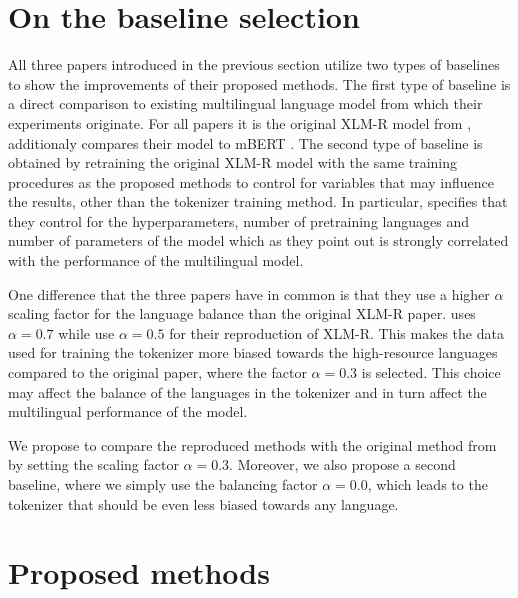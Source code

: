 
\section{On the baseline selection}

All three papers introduced in the previous section utilize two types of baselines to show the improvements of their proposed methods. The first type of baseline is a direct comparison to existing multilingual language model from which their experiments originate. For all papers it is the original XLM-R model from \citet{conneau_unsupervised_2020}, \citet{chung_improving_2020} additionaly compares their model to mBERT \cite{devlin_bert_2019}. The second type of baseline is obtained by retraining the original XLM-R model with the same training procedures as the proposed methods to control for variables that may influence the results, other than the tokenizer training method. In particular, \citet{chung_improving_2020} specifies that they control for the hyperparameters, number of pretraining languages and number of parameters of the model which as they point out is strongly correlated with the performance of the multilingual model. \cite{conneau_unsupervised_2020}

One difference that the three papers have in common is that they use a higher $\alpha$ scaling factor for the language balance than the original XLM-R paper. \citet{zheng_allocating_2021} uses $\alpha=0.7$ while \citet{chung_improving_2020,liang_xlm-v_2023} use $\alpha=0.5$ for their reproduction of XLM-R. This makes the data used for training the tokenizer more biased towards the high-resource languages compared to the original paper, where the factor $\alpha=0.3$ is selected. This choice may affect the balance of the languages in the tokenizer and in turn affect the multilingual performance of the model.

We propose to compare the reproduced methods with the original method from \citet{conneau_unsupervised_2020} by setting the scaling factor $\alpha=0.3$. Moreover, we also propose a second baseline, where we simply use the balancing factor $\alpha=0.0$, which leads to the tokenizer that should be even less biased towards any language. 

\section{Proposed methods}

